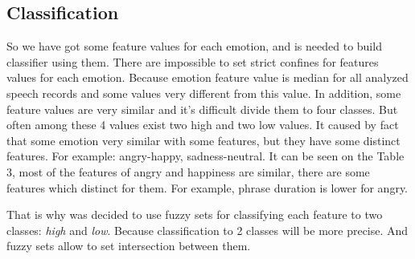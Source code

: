 \documentclass[12pt, letterpaper]{article}
\begin{document}
\subsection{Classification}
So we have got some feature values for each emotion, and is needed to build classifier using them. There are impossible to set strict confines for features values for each emotion. Because emotion feature value is median for all analyzed speech records and some values very different from this value. In addition, some feature values are very similar and it's difficult divide them to four classes. But often among these 4 values exist two high and two low values. It caused by fact that some emotion very similar with some features, but they have some distinct features.
For example: angry-happy, sadness-neutral. It can be seen on the Table 3, most of the features of angry and happiness are similar, there are some features which distinct for them. For example, phrase duration is lower for angry.

That is why was decided to use fuzzy sets for classifying each feature to two classes: \emph{high} and \emph{low}. Because classification to 2 classes will be more precise. And fuzzy sets allow to set intersection between them.
\end{document}
